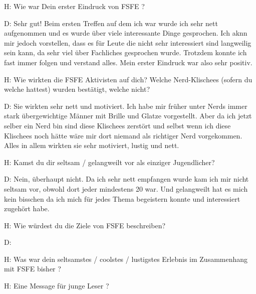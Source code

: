 H: Wie war Dein erster Eindruck von FSFE ?


D: Sehr gut! Beim ersten Treffen auf dem ich war wurde ich sehr nett aufgenommen und es wurde über viele interessante
   Dinge gesprochen. Ich aknn mir jedoch vorstellen, dass es für Leute die nicht sehr interessiert sind langweilig sein kann,
   da sehr viel über Fachliches gesprochen wurde. Trotzdem konnte ich fast immer folgen und verstand alles. Mein erster
   Eindruck war also sehr positiv.





H: Wie wirkten die FSFE Aktivisten auf dich? Welche Nerd-Klischees (sofern du welche hattest) wurden bestätigt, 
   welche nicht?


D: Sie wirkten sehr nett und motiviert. Ich habe mir früher unter Nerds immer stark übergewichtige Männer mit Brille und Glatze
   vorgestellt. Aber da ich jetzt selber ein Nerd bin sind diese Klischees zerstört und selbst wenn ich diese Klischees noch
   hätte wäre mir dort niemand als richtiger Nerd vorgekommen. Alles in allem wirkten sie sehr motiviert, lustig und nett.





H: Kamst du dir seltsam / gelangweilt vor als einziger Jugendlicher?


D: Nein, überhaupt nicht. Da ich sehr nett empfangen wurde kam ich mir nicht seltsam vor, obwohl dort jeder mindestens 20 war.
   Und gelangweilt hat es mich kein bisschen da ich mich für jedes Thema begeistern konnte und interessiert zugehört habe.





H: Wie würdest du die Ziele von FSFE beschreiben?


D: 





H: Was war dein seltsamstes / coolstes / lustigstes Erlebnis im Zusammenhang mit FSFE bisher ?


H: Eine Message für junge Leser ?


